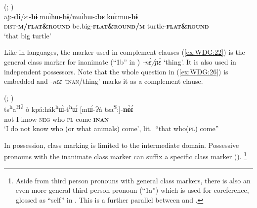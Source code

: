 \documentclass[output=collectionpaper]{langsci/langscibook}
\begin{document}
\ea\label{ex:WDG:25}
  (; \citealt[169]{Seifart2005})\\
\gll aj:-\textbf{di}/ɛ:-\textbf{hɨ}	mɯ́hɯ-\textbf{hɨ}/mɯ́hɯ-\textbf{:bɛ}	kɯ́:mɯ-\textbf{hɨ}\\
	\textsc{dist-\textbf{m/flat\&round}} 	be.big-\textbf{\textsc{flat\&round/m}}	turtle-\textbf{\textsc{flat\&round}}\\
\glt 	`that big turtle'\\
\z

Like in  languages, the marker used in complement clauses (\ref{ex:WDG:22}) is the general class marker for inanimate (``1b'' in ) \textit{-nɛ̀/ɲɛ̀} `thing'. It is also used in independent possessors. Note that the whole question in (\ref{ex:WDG:26}) is embedded and \textit{-nɛɛ} `\textsc{inan}/thing' marks it as a complement clause.

\ea\label{ex:WDG:26}
 (; \citealt[364]{Thiesen2012})\\
\gll ts\textsuperscript{h}a\textsuperscript{HɁ}	ò 	kpá:hák\textsuperscript{h}ɯ̀-t\textsuperscript{h}ɯ́	[mɯ́-Ɂà 	tsa\textsuperscript{S}:]-\textbf{nɛ̀ɛ́}\\
not	I	know-\textsc{neg}	who-\textsc{pl} 	come-\textbf{\textsc{inan}}\\
\glt	`I do not know who (or what animals) come', lit.\ ``that who(\textsc{pl}) come''\\
\z

In possession, class marking is limited to the intermediate domain. Possessive pronouns with the inanimate class marker can suffix a specific class marker (\citealt[179]{Thiesen2012}).%
\footnote{%
Aside from third person pronouns with general class markers, there is also an even more general third person pronoun (``1a'') which is used for coreference, glossed as ``self'' in \cite[360]{Thiesen2012}. This is a further parallel between  and .
} %
\end{document}

